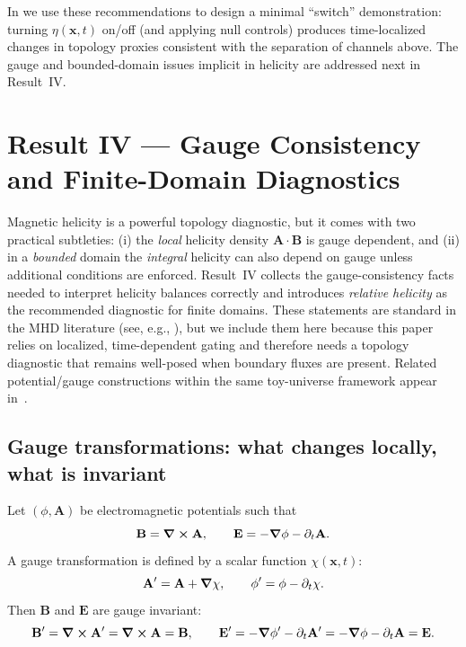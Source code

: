\documentclass[11pt]{article}
\theoremstyle{plain}
\theoremstyle{definition}
\theoremstyle{remark}
\newcommand{\A}{\mathbf{A}}
\newcommand{\B}{\mathbf{B}}
\newcommand{\E}{\mathbf{E}}
\begin{document}
In  we use these recommendations to design a minimal ``switch'' demonstration:
turning $\eta(\mathbf{x},t)$ on/off (and applying null controls) produces time-localized changes in
topology proxies consistent with the separation of channels above. The gauge and bounded-domain issues
implicit in helicity are addressed next in Result~IV.

\section{Result IV --- Gauge Consistency and Finite-Domain Diagnostics}\label{sec:result_gauge}

Magnetic helicity is a powerful topology diagnostic, but it comes with two practical subtleties:
(i) the \emph{local} helicity density $\A\cdot\B$ is gauge dependent, and
(ii) in a \emph{bounded} domain the \emph{integral} helicity can also depend on gauge unless additional
conditions are enforced. Result~IV collects the gauge-consistency facts needed to interpret helicity
balances correctly and introduces \emph{relative helicity} as the recommended diagnostic for finite
domains. These statements are standard in the MHD literature (see, e.g., \cite{BergerField1984,FinnAntonsen1985}),
but we include them here because this paper relies on localized, time-dependent gating and therefore needs
a topology diagnostic that remains well-posed when boundary fluxes are present. Related potential/gauge constructions within the same toy-universe framework appear in~\cite{Norris:Paper4,Norris:Paper5}.

\subsection{Gauge transformations: what changes locally, what is invariant}\label{sec:result_gauge_transform}
Let $(\phi,\A)$ be electromagnetic potentials such that
\begin{equation}\label{eq:potentials_gauge_R4}
  \B = \curl\A,
  \qquad
  \E = -\grad\phi - \partial_t\A.
\end{equation}
A gauge transformation is defined by a scalar function $\chi(\mathbf{x},t)$:
\begin{equation}\label{eq:gauge_transform}
  \A' = \A + \grad\chi,
  \qquad
  \phi' = \phi - \partial_t\chi.
\end{equation}
Then $\B$ and $\E$ are gauge invariant:
\begin{equation}\label{eq:fields_gauge_invariant}
  \B' = \curl\A' = \curl\A = \B,
  \qquad
  \E' = -\grad\phi' - \partial_t\A' = -\grad\phi - \partial_t\A = \E.
\end{equation}
\end{document}
